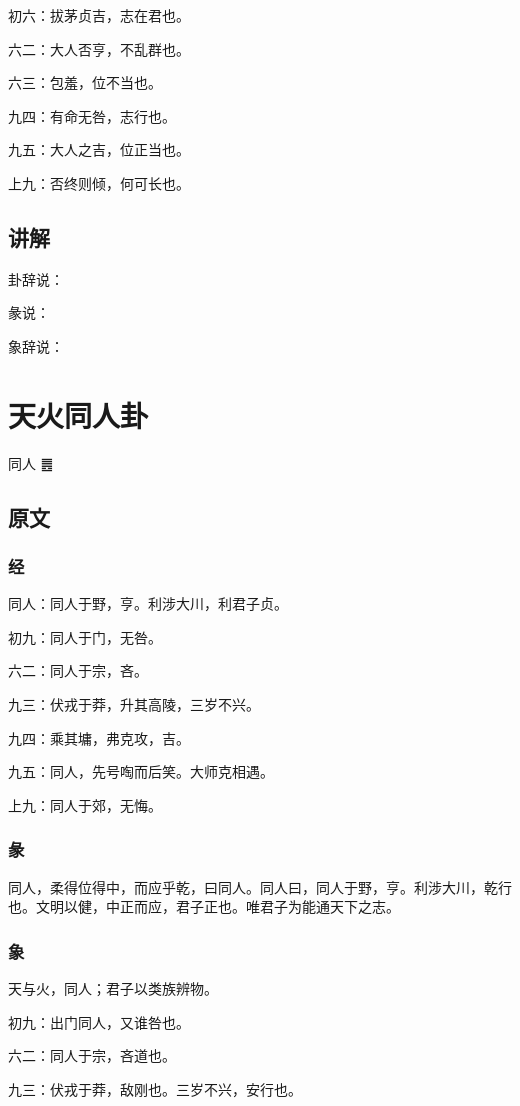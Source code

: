 \documentclass[12pt,oneside]{book}
\begin{document}
初六：拔茅贞吉，志在君也。

六二：大人否亨，不乱群也。

六三：包羞，位不当也。

九四：有命无咎，志行也。

九五：大人之吉，位正当也。

上九：否终则倾，何可长也。


\section{讲解}
卦辞说：

彖说：

象辞说：


\chapter{天火同人卦}
同人 {\Large ䷌}

\section{原文}

\subsection{经}
同人：同人于野，亨。利涉大川，利君子贞。

初九：同人于门，无咎。

六二：同人于宗，吝。

九三：伏戎于莽，升其高陵，三岁不兴。

九四：乘其墉，弗克攻，吉。

九五：同人，先号啕而后笑。大师克相遇。

上九：同人于郊，无悔。

\subsection{彖}
同人，柔得位得中，而应乎乾，曰同人。同人曰，同人于野，亨。利涉大川，乾行也。文明以健，中正而应，君子正也。唯君子为能通天下之志。

\subsection{象}
天与火，同人；君子以类族辨物。

初九：出门同人，又谁咎也。

六二：同人于宗，吝道也。

九三：伏戎于莽，敌刚也。三岁不兴，安行也。
\end{document}
